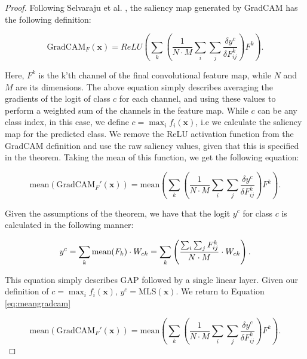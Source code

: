 \documentclass[runningheads]{llncs}
\begin{document}
\begin{proof}

Following Selvaraju et al. \cite{gradcam}, the saliency map generated by GradCAM has the following definition:

\begin{equation}
    \text{GradCAM}_F(\bm{x}) = ReLU\left(\sum_k \left( \frac{1}{N \cdot M} \sum_i \sum_j \frac{\delta y^c}{\delta F_{ij}^k} \right) F^k \right).
\end{equation}

\noindent Here, $F^k$ is the k'th channel of the final convolutional feature map, while $N$ and $M$ are its dimensions. The above equation simply describes averaging the gradients of the logit of class $c$ for each channel, and using these values to perform a weighted sum of the channels in the feature map. While $c$ can be any class index, in this case, we define $c = \max_i f_i(\bm{x})$, i.e we calculate the saliency map for the predicted class. We remove the ReLU activation function from the GradCAM definition and use the raw saliency values, given that this is specified in the theorem. Taking the mean of this function, we get the following equation:

\begin{equation} \label{eq:meangradcam}
    \text{mean}(\text{GradCAM}_F'(\bm{x})) =
    \text{mean} \left(\sum_k \left( \frac{1}{N \cdot M} \sum_i \sum_j \frac{\delta y^c}{\delta F_{ij}^k} \right) F^k \right).
\end{equation}

\noindent Given the assumptions of the theorem, we have that the logit $y^c$ for class $c$ is calculated in the following manner:

\begin{equation} \label{eq:yc}
    y^c = \sum_k \text{mean}(F_k) \cdot W_{ck} \\
    = \sum_k \left( \frac{\sum_i \sum_j F^k_{ij}}{N \cdot M} \cdot W_{ck} \right) .
\end{equation}

\noindent This equation simply describes GAP followed by a single linear layer. Given our definition of $c = \max_i f_i(\bm{x})$, $y^c = \text{MLS}(\bm{x})$. We return to Equation \ref{eq:meangradcam}

\begin{equation} \label{eq:salagg}
    \text{mean}(\text{GradCAM}_F'(\bm{x})) =
    \text{mean} \left(\sum_k \left( \frac{1}{N \cdot M} \sum_i \sum_j \frac{\delta y^c}{\delta F_{ij}^k} \right) F^k \right).
\end{equation}


\end{proof}
\end{document}
